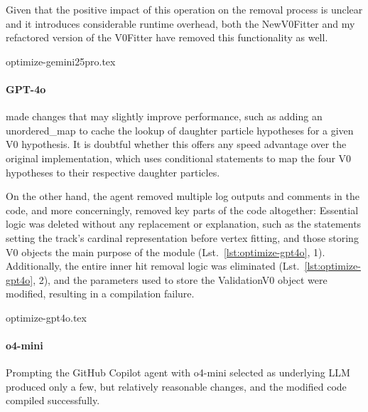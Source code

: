 Given that the positive impact of this operation on the removal process is unclear and it introduces considerable runtime overhead, both the NewV0Fitter and my refactored version of the V0Fitter have removed this functionality as well.

\begin{lstbox}{%
    \label{lst:optimize-gemini25pro}
  }
  {optimize-gemini25pro.tex}
\end{lstbox}

\paragraph{GPT-4o} made changes that may slightly improve performance, such as adding an unordered\_map to cache the lookup of daughter particle hypotheses for a given V0 hypothesis.
It is doubtful whether this offers any speed advantage over the original implementation, which uses conditional statements to map the four V0 hypotheses to their respective daughter particles.

On the other hand, the agent removed multiple log outputs and comments in the code, and more concerningly, removed key parts of the code altogether:
Essential logic was deleted without any replacement or explanation, such as the statements setting the track's cardinal representation before vertex fitting, and those storing V0 objects \textemdash the main purpose of the module (Lst.\ \ref{lst:optimize-gpt4o}, 1).
Additionally, the entire inner hit removal logic was eliminated (Lst.\ \ref{lst:optimize-gpt4o}, 2), and the parameters used to store the ValidationV0 object were modified, resulting in a compilation failure.

\begin{lstbox}{%
    \label{lst:optimize-gpt4o}
  }
  {optimize-gpt4o.tex}
\end{lstbox}

\paragraph{o4-mini}
Prompting the GitHub Copilot agent with o4-mini selected as underlying LLM produced only a few, but relatively reasonable changes, and the modified code compiled successfully.


